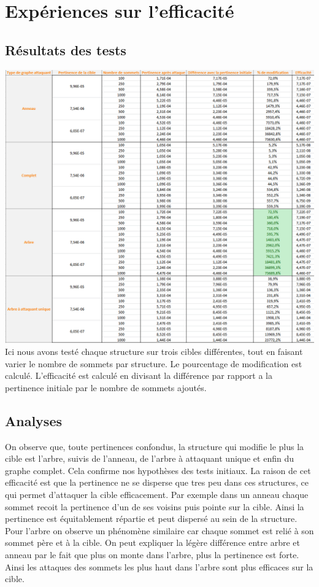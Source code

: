 \documentclass[a4paper,11pt]{article}
\begin{document}
\section{Expériences sur l'efficacité}
	
	\subsection{Résultats des tests}
		\includegraphics[scale = 0.5]{Captures/ranking5.PNG}\\
		Ici nous avons testé chaque structure sur trois cibles différentes, tout en faisant varier le nombre de sommets par structure. 
		Le pourcentage de modification est calculé. L'efficacité est calculé en divisant la différence par rapport a la pertinence initiale par le nombre de sommets ajoutés.\\
	\subsection{Analyses}
		On observe que, toute pertinences confondus, la structure qui modifie le plus la cible est l'arbre, suivis de l'anneau, de l'arbre à attaquant unique et enfin du graphe complet.
		Cela confirme nos hypothèses des tests initiaux. La raison de cet efficacité est que la pertinence ne se disperse que tres peu dans ces structures, ce qui permet d'attaquer 
		la cible efficacement. Par exemple dans un anneau chaque sommet recoit la pertinence d'un de ses voisins puis pointe sur la cible. Ainsi la pertinence est équitablement répartie et peut dispersé au sein de la structure.
		Pour l'arbre on observe un phénomène similaire car chaque sommet est relié à son sommet père et à la cible. On peut expliquer la légère différence entre arbre et anneau par le fait 
		que plus on monte dans l'arbre, plus la pertinence est forte. Ainsi les attaques des sommets les plus haut dans l'arbre sont plus efficaces sur la cible.\\
		
\end{document}
